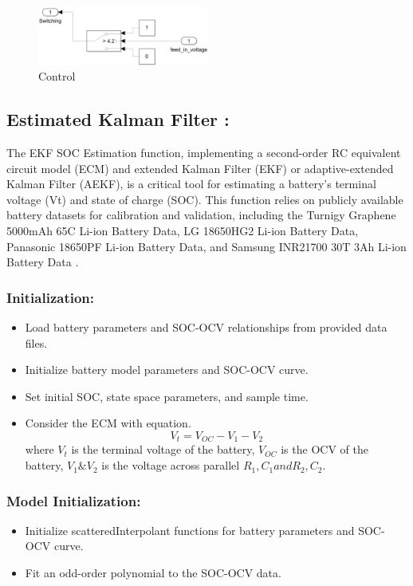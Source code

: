 \documentclass[conference]{IEEEtran}
\begin{document}
\begin{figure}[htbp]
    \centering
    \includegraphics[width=0.5\textwidth]{images/control.jpeg}
    \caption{Control}
    \label{control}
\end{figure}

\subsection{Estimated Kalman Filter :}
The EKF SOC Estimation function, implementing a second-order RC equivalent circuit model (ECM) and extended Kalman Filter (EKF) or adaptive-extended Kalman Filter (AEKF), is a critical tool for estimating a battery's terminal voltage (Vt) and state of charge (SOC). This function relies on publicly available battery datasets for calibration and validation, including the Turnigy Graphene 5000mAh 65C Li-ion Battery Data, LG 18650HG2 Li-ion Battery Data, Panasonic 18650PF Li-ion Battery Data, and Samsung INR21700 30T 3Ah Li-ion Battery Data \cite{turnigy_data}\cite{lg_data}\cite{samsung_data}\cite{panasonic_data}.


\subsubsection{Initialization:}
\begin{itemize}
  \item Load battery parameters and SOC-OCV relationships from provided data files.
  \item Initialize battery model parameters and SOC-OCV curve.
  \item Set initial SOC, state space parameters, and sample time.
  \item Consider the ECM with equation.
  $${V_t = V_{OC} - V_1 - V_2}$$
  where $V_t$ is the terminal voltage of the battery, $V_{OC}$ is the OCV of the battery, $V_1 \& V_2$ is the voltage across parallel $R_1, C_1 and R_2, C_2$.
\end{itemize}

\subsubsection{Model Initialization:}
\begin{itemize}
  \item Initialize scatteredInterpolant functions for battery parameters and SOC-OCV curve.
  \item Fit an odd-order polynomial to the SOC-OCV data.
\end{itemize}
\end{document}

